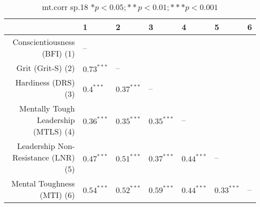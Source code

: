 \begin{table}[ht]
\centering
\begin{tabular}{rllllll}
  \hline
 & 1 & 2 & 3 & 4 & 5 & 6 \\ 
  \hline
Conscientiousness (BFI) (1) & -- &  &  &  &  &  \\ 
  Grit (Grit-S) (2) & $0.73^{***}$ & -- &  &  &  &  \\ 
  Hardiness (DRS) (3) & $0.4^{***}$ & $0.37^{***}$ & -- &  &  &  \\ 
  Mentally Tough Leadership (MTLS) (4) & $0.36^{***}$ & $0.35^{***}$ & $0.35^{***}$ & -- &  &  \\ 
  Leadership Non-Resistance (LNR) (5) & $0.47^{***}$ & $0.51^{***}$ & $0.37^{***}$ & $0.44^{***}$ & -- &  \\ 
  Mental Toughness (MTI) (6) & $0.54^{***}$ & $0.52^{***}$ & $0.59^{***}$ & $0.44^{***}$ & $0.33^{***}$ & -- \\ 
   \hline
\end{tabular}
\caption{mt.corr sp.18 $* p < 0.05; ** p < 0.01; *** p < 0.001$} 
\label{freq_corr.mt.corr.sp.18}
\end{table}
